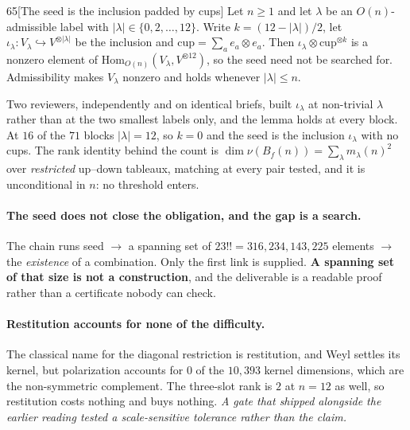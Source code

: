 \begin{Lem}{65}[The seed is the inclusion padded by cups]
Let $n\ge1$ and let $\lambda$ be an $O(n)$-admissible label with $|\lambda|\in\{0,2,\dots,12\}$. Write $k=(12-|\lambda|)/2$, let $\iota_\lambda\colon V_\lambda\hookrightarrow V^{\otimes|\lambda|}$ be the inclusion and $\mathrm{cup}=\sum_ae_a\otimes e_a$. Then $\iota_\lambda\otimes\mathrm{cup}^{\otimes k}$ is a nonzero element of $\mathrm{Hom}_{O(n)}(V_\lambda,V^{\otimes12})$, so the seed need not be searched for. Admissibility makes $V_\lambda$ nonzero and holds whenever $|\lambda|\le n$.
\end{Lem}

\begin{certificate}
Two reviewers, independently and on identical briefs, built $\iota_\lambda$ at non-trivial $\lambda$ rather than at the two smallest labels only, and the lemma holds at every block. At $16$ of the $71$ blocks $|\lambda|=12$, so $k=0$ and the seed is the inclusion $\iota_\lambda$ with no cups. The rank identity behind the count is $\dim\nu(B_f(n))=\sum_\lambda m_\lambda(n)^2$ over \emph{restricted} up--down tableaux, matching at every pair tested, and it is unconditional in $n$: no threshold enters.
\end{certificate}

\paragraph{The seed does not close the obligation, and the gap is a search.} The chain runs seed $\to$ a spanning set of $23!!=316{,}234{,}143{,}225$ elements $\to$ the \emph{existence} of a combination. Only the first link is supplied. \textbf{A spanning set of that size is not a construction}, and the deliverable is a readable proof rather than a certificate nobody can check.

\paragraph{Restitution accounts for none of the difficulty.} The classical name for the diagonal restriction is restitution, and Weyl settles its kernel, but polarization accounts for $0$ of the $10{,}393$ kernel dimensions, which are the non-symmetric complement. The three-slot rank is $2$ at $n=12$ as well, so restitution costs nothing and buys nothing. \emph{A gate that shipped alongside the earlier reading tested a scale-sensitive tolerance rather than the claim.}

